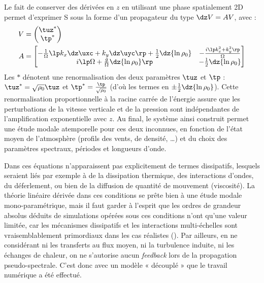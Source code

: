 Le fait de conserver des dérivées en $z$ en utilisant une phase spatialement 2D permet d'exprimer S sous la forme d'un propagateur du type $\dz V = A V$, avec :
\begin{align}
V & =
\begin{pmatrix}
    \tuz^* \\
    \tp^*
\end{pmatrix} \\
A & =
\begin{bmatrix}
    -\frac{1}{\Omega} \lp k_x \dz \uxc + k_y \dz \uyc \rp + \frac{1}{2} \dz{\ln{\rho_0}} & -\frac{i \lp k_x^2 + k_y^2 \rp}{\Omega}   \\
    i \lp \Omega + \frac{g}{\Omega} \dz{\ln{\rho_0}} \rp                                  & -\frac{1}{2} \dz{\ln{\rho_0}}             \notag
\end{bmatrix}
\end{align}
Les $*$ dénotent une renormalisation des deux paramètres $\tuz$ et $\tp$ : $\tuz^* = \sqrt{\rho_0} \tuz$ et $\tp^* = \frac{\tp}{\sqrt{\rho_0}}$ (d'où les termes en $\pm \frac{1}{2} \dz{\ln{\rho_0}}$). Cette renormalisation proportionnelle à la racine carrée de l'énergie assure que les perturbations de la vitesse verticale et de la pression sont indépendantes de l'amplification exponentielle avec $z$. Au final, le système ainsi construit permet une étude modale atemporelle pour ces deux inconnues, en fonction de l'état moyen de l'atmosphère (profils des vents, de densité, …) et du choix des paramètres spectraux, \ie périodes et longueurs d'onde.

Dans ces équations n'apparaissent pas explicitement de termes dissipatifs, lesquels seraient liés par exemple à de la dissipation thermique, des interactions d'ondes, du déferlement, ou bien de la diffusion de quantité de mouvement (viscosité). La théorie linéaire dérivée dans ces conditions se prête bien à une étude modale mono-paramétrique, mais il faut garder à l'esprit que les ordres de grandeur absolus déduits de simulations opérées sous ces conditions n'ont qu'une valeur limitée, car les mécanismes dissipatifs et les interactions multi-échelles sont vraisemblablement primordiaux dans les cas réalistes (\cite{Fritts2003}). Par ailleurs, en ne considérant ni les transferts au flux moyen, ni la turbulence induite, ni les échanges de chaleur, on ne s'autorise aucun \emph{feedback} lors de la propagation pseudo-spectrale. C'est donc avec un modèle « découplé » que le travail numérique a été effectué.


